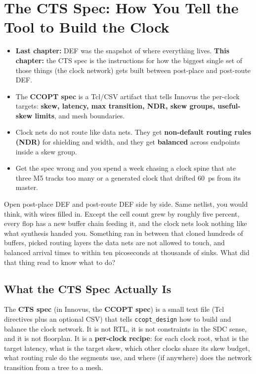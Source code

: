 \chapter{The CTS Spec: How You Tell the Tool to Build the Clock}

\begin{tldr}
\begin{itemize}
  \item \textbf{Last chapter:} DEF was the snapshot of where everything lives. \textbf{This chapter:} the CTS spec is the instructions for how the biggest single set of those things (the clock network) gets built between post-place and post-route DEF.
  \item The \textbf{CCOPT spec} is a Tcl/CSV artifact that tells Innovus the per-clock targets: \textbf{skew, latency, max transition, NDR, skew groups, useful-skew limits}, and mesh boundaries.
  \item Clock nets do not route like data nets. They get \textbf{non-default routing rules (NDR)} for shielding and width, and they get \textbf{balanced} across endpoints inside a skew group.
  \item Get the spec wrong and you spend a week chasing a clock spine that ate three M5 tracks too many or a generated clock that drifted 60~ps from its master.
\end{itemize}
\end{tldr}

\begin{hook}
Open post-place DEF and post-route DEF side by side. Same netlist, you would think, with wires filled in. Except the cell count grew by roughly five percent, every flop has a new buffer chain feeding it, and the clock nets look nothing like what synthesis handed you. Something ran in between that cloned hundreds of buffers, picked routing layers the data nets are not allowed to touch, and balanced arrival times to within ten picoseconds at thousands of sinks. What did that thing read to know what to do?
\end{hook}

\section{What the CTS Spec Actually Is}

The \textbf{CTS spec} (in Innovus, the \textbf{CCOPT spec}) is a small text file (Tcl directives plus an optional CSV) that tells \texttt{ccopt\_design} how to build and balance the clock network. It is not RTL, it is not constraints in the SDC sense, and it is not floorplan. It is a \textbf{per-clock recipe}: for each clock root, what is the target latency, what is the target skew, which other clocks share its skew budget, what routing rule do the segments use, and where (if anywhere) does the network transition from a tree to a mesh.

